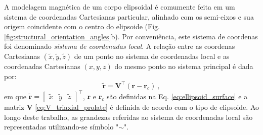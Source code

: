 A modelagem magnética de um corpo elipsoidal é comumente feita em um sistema de coordenadas Cartesianas particular, alinhado com os semi-eixos e sua origem coincidente com o centro do elipsoide (Fig. \ref{fig:structural_orientation_angles}b). Por conveniência, este sistema de coordenas foi denominado \textit{sistema de coordenadas local}.
A relação entre as coordenas Cartesianas $(\tilde{x}, \tilde{y}, \tilde{z})$
de um ponto no sistema de coordenadas local e as coordenadas Cartesianas $(x, y, z)$ do mesmo ponto no sistema principal é dada por:
\begin{equation}
\tilde{\mathbf{r}} = \mathbf{V}^{\top} \left( \mathbf{r} - \mathbf{r}_{c} \right) \: ,
\label{eq:coord_transformation}
\end{equation}
em que 
$\tilde{\mathbf{r}} = [\begin{array}{ccc} \tilde{x} & 
\tilde{y} & 
\tilde{z} \end{array} ]^{\top}$,
$\mathbf{r}$ e $\mathbf{r}_{c}$
são definidas na Eq. \ref{eq:ellipsoid_surface} e a matriz $\mathbf{V}$ \ref{eq:V_triaxial_prolate}
é definida de acordo com o tipo de elipsoide. Ao longo deste trabalho, as grandezas referidas ao sistema de coordenadas local são representadas utilizando-se símbolo "$\sim$".


